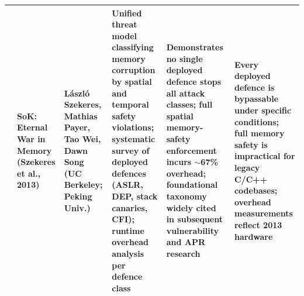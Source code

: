 {\begin{longtable}{|>{\centering\arraybackslash}p{0.6cm}|>{\raggedright\arraybackslash}p{1.9cm}|p{2.5cm}|p{3.0cm}|p{3.0cm}|p{3.0cm}|}
9 &
\textbf{SoK: Eternal War in Memory} \newline \cite{b9} \newline (Szekeres et al., 2013) &
L\'{a}szl\'{o} Szekeres, Mathias Payer, Tao Wei, Dawn Song \newline (UC Berkeley; Peking Univ.) &
Unified threat model classifying memory corruption by spatial and temporal safety violations; systematic survey of deployed defences (ASLR, DEP, stack canaries, CFI); runtime overhead analysis per defence class &
Demonstrates no single deployed defence stops all attack classes; full spatial memory-safety enforcement incurs $\sim$67\% overhead; foundational taxonomy widely cited in subsequent vulnerability and APR research &
Every deployed defence is bypassable under specific conditions; full memory safety is impractical for legacy C/C++ codebases; overhead measurements reflect 2013 hardware \\
\hline

\end{longtable}
}

